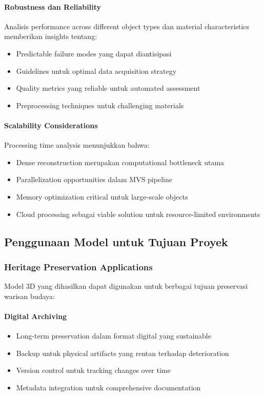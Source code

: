 \documentclass[12pt,a4paper]{article}
\begin{document}
\paragraph{Robustness dan Reliability}
Analisis performance across different object types dan material characteristics memberikan insights tentang:

\begin{itemize}
    \item Predictable failure modes yang dapat diantisipasi
    \item Guidelines untuk optimal data acquisition strategy
    \item Quality metrics yang reliable untuk automated assessment
    \item Preprocessing techniques untuk challenging materials
\end{itemize}

\paragraph{Scalability Considerations}
Processing time analysis menunjukkan bahwa:

\begin{itemize}
    \item Dense reconstruction merupakan computational bottleneck utama
    \item Parallelization opportunities dalam MVS pipeline
    \item Memory optimization critical untuk large-scale objects
    \item Cloud processing sebagai viable solution untuk resource-limited environments
\end{itemize}

\subsection{Penggunaan Model untuk Tujuan Proyek}

\subsubsection{Heritage Preservation Applications}

Model 3D yang dihasilkan dapat digunakan untuk berbagai tujuan preservasi warisan budaya:

\paragraph{Digital Archiving}
\begin{itemize}
    \item Long-term preservation dalam format digital yang sustainable
    \item Backup untuk physical artifacts yang rentan terhadap deterioration
    \item Version control untuk tracking changes over time
    \item Metadata integration untuk comprehensive documentation
\end{itemize}
\end{document}
